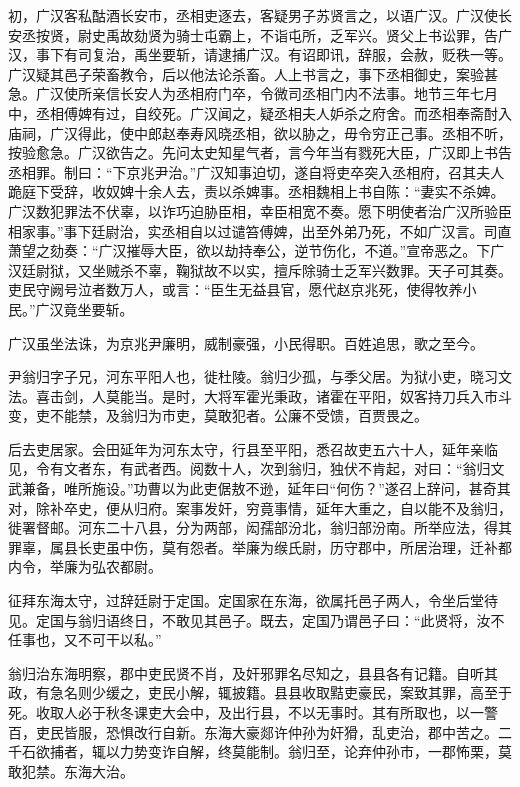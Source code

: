 \documentclass[]{article}
\begin{document}
初，广汉客私酤酒长安市，丞相吏逐去，客疑男子苏贤言之，以语广汉。广汉使长安丞按贤，尉史禹故劾贤为骑士屯霸上，不诣屯所，乏军兴。贤父上书讼罪，告广汉，事下有司复治，禹坐要斩，请逮捕广汉。有诏即讯，辞服，会赦，贬秩一等。广汉疑其邑子荣畜教令，后以他法论杀畜。人上书言之，事下丞相御史，案验甚急。广汉使所亲信长安人为丞相府门卒，令微司丞相门内不法事。地节三年七月中，丞相傅婢有过，自绞死。广汉闻之，疑丞相夫人妒杀之府舍。而丞相奉斋酎入庙祠，广汉得此，使中郎赵奉寿风晓丞相，欲以胁之，毋令穷正己事。丞相不听，按验愈急。广汉欲告之。先问太史知星气者，言今年当有戮死大臣，广汉即上书告丞相罪。制曰：``下京兆尹治。''广汉知事迫切，遂自将吏卒突入丞相府，召其夫人跪庭下受辞，收奴婢十余人去，责以杀婢事。丞相魏相上书自陈：``妻实不杀婢。广汉数犯罪法不伏辜，以诈巧迫胁臣相，幸臣相宽不奏。愿下明使者治广汉所验臣相家事。''事下廷尉治，实丞相自以过谴笞傅婢，出至外弟乃死，不如广汉言。司直萧望之劾奏：``广汉摧辱大臣，欲以劫持奉公，逆节伤化，不道。''宣帝恶之。下广汉廷尉狱，又坐贼杀不辜，鞠狱故不以实，擅斥除骑士乏军兴数罪。天子可其奏。吏民守阙号泣者数万人，或言：``臣生无益县官，愿代赵京兆死，使得牧养小民。''广汉竟坐要斩。

广汉虽坐法诛，为京兆尹廉明，威制豪强，小民得职。百姓追思，歌之至今。

尹翁归字子兄，河东平阳人也，徙杜陵。翁归少孤，与季父居。为狱小吏，晓习文法。喜击剑，人莫能当。是时，大将军霍光秉政，诸霍在平阳，奴客持刀兵入市斗变，吏不能禁，及翁归为市吏，莫敢犯者。公廉不受馈，百贾畏之。

后去吏居家。会田延年为河东太守，行县至平阳，悉召故吏五六十人，延年亲临见，令有文者东，有武者西。阅数十人，次到翁归，独伏不肯起，对曰：``翁归文武兼备，唯所施设。''功曹以为此吏倨敖不逊，延年曰``何伤？''遂召上辞问，甚奇其对，除补卒史，便从归府。案事发奸，穷竟事情，延年大重之，自以能不及翁归，徙署督邮。河东二十八县，分为两部，闳孺部汾北，翁归部汾南。所举应法，得其罪辜，属县长吏虽中伤，莫有怨者。举廉为缑氏尉，历守郡中，所居治理，迁补都内令，举廉为弘农都尉。

征拜东海太守，过辞廷尉于定国。定国家在东海，欲属托邑子两人，令坐后堂待见。定国与翁归语终日，不敢见其邑子。既去，定国乃谓邑子曰：``此贤将，汝不任事也，又不可干以私。''

翁归治东海明察，郡中吏民贤不肖，及奸邪罪名尽知之，县县各有记籍。自听其政，有急名则少缓之，吏民小解，辄披籍。县县收取黠吏豪民，案致其罪，高至于死。收取人必于秋冬课吏大会中，及出行县，不以无事时。其有所取也，以一警百，吏民皆服，恐惧改行自新。东海大豪郯许仲孙为奸猾，乱吏治，郡中苦之。二千石欲捕者，辄以力势变诈自解，终莫能制。翁归至，论弃仲孙市，一郡怖栗，莫敢犯禁。东海大治。
\end{document}
